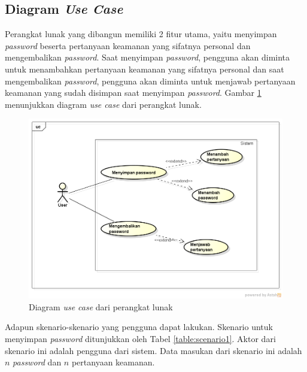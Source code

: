 \subsection{Diagram \textit{Use Case}}

Perangkat lunak yang dibangun memiliki 2 fitur utama, yaitu menyimpan \textit{password} beserta pertanyaan keamanan yang sifatnya personal dan mengembalikan \textit{password}. Saat menyimpan \textit{password}, pengguna akan diminta untuk menambahkan pertanyaan keamanan yang sifatnya personal dan saat mengembalikan \textit{password}, pengguna akan diminta untuk menjawab pertanyaan keamanan yang sudah disimpan saat menyimpan \textit{password}. Gambar \ref{fig:use_case} menunjukkan diagram \textit{use case} dari perangkat lunak.

\begin{figure}[h]
	\centerline{\includegraphics[scale=0.5]{Gambar/use_case}}
	\caption{Diagram \textit{use case} dari perangkat lunak}\label{fig:use_case}
\end{figure}

Adapun skenario-skenario yang pengguna dapat lakukan. Skenario untuk menyimpan \textit{password} ditunjukkan oleh Tabel \ref{table:scenario1}. Aktor dari skenario ini adalah pengguna dari sistem. Data masukan dari skenario ini adalah $n$ \textit{password} dan $n$ pertanyaan keamanan.

